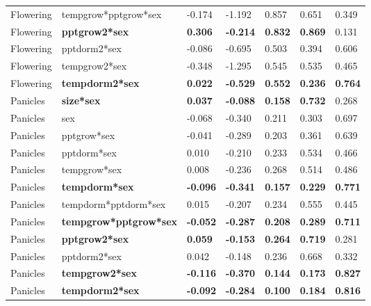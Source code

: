 \documentclass[9pt,twoside,lineno]{pnas-new}
\begin{document}
\begin{table}[]
\begin{tabular}{lllllll}
Flowering & tempgrow*pptgrow*sex & -0.174 & -1.192 & 0.857 & 0.651 & 0.349 \\
Flowering & \textbf{pptgrow2*sex} & \textbf{0.306} & \textbf{-0.214} & \textbf{0.832} & \textbf{0.869} & 0.131 \\
Flowering & pptdorm2*sex & -0.086 & -0.695 & 0.503 & 0.394 & 0.606 \\
Flowering & tempgrow2*sex & -0.348 & -1.295 & 0.545 & 0.535 & 0.465 \\
Flowering & \textbf{tempdorm2*sex} & \textbf{0.022} & \textbf{-0.529} & \textbf{0.552} & \textbf{0.236} & \textbf{0.764} \\
Panicles & \textbf{size*sex} & \textbf{0.037} & \textbf{-0.088} & \textbf{0.158} & \textbf{0.732} & 0.268 \\
Panicles & sex & -0.068 & -0.340 & 0.211 & 0.303 & 0.697 \\
Panicles & pptgrow*sex & -0.041 & -0.289 & 0.203 & 0.361 & 0.639 \\
Panicles & pptdorm*sex & 0.010 & -0.210 & 0.233 & 0.534 & 0.466 \\
Panicles & tempgrow*sex & 0.008 & -0.236 & 0.268 & 0.514 & 0.486 \\
Panicles & \textbf{tempdorm*sex} & \textbf{-0.096} & \textbf{-0.341} & \textbf{0.157} & \textbf{0.229} & \textbf{0.771} \\
Panicles & tempdorm*pptdorm*sex & 0.015 & -0.207 & 0.234 & 0.555 & 0.445 \\
Panicles & \textbf{tempgrow*pptgrow*sex} & \textbf{-0.052} & \textbf{-0.287} & \textbf{0.208} & \textbf{0.289} & \textbf{0.711} \\
Panicles & \textbf{pptgrow2*sex} & \textbf{0.059} & \textbf{-0.153} & \textbf{0.264} & \textbf{0.719} & 0.281 \\
Panicles & pptdorm2*sex & 0.042 & -0.148 & 0.236 & 0.668 & 0.332 \\
Panicles & \textbf{tempgrow2*sex} & \textbf{-0.116} & \textbf{-0.370} & \textbf{0.144} & \textbf{0.173} & \textbf{0.827} \\
Panicles & \textbf{tempdorm2*sex} & \textbf{-0.092} & \textbf{-0.284} & \textbf{0.100} & \textbf{0.184} & \textbf{0.816}\\
\bottomrule
\end{tabular}
\end{table}



\end{document}
